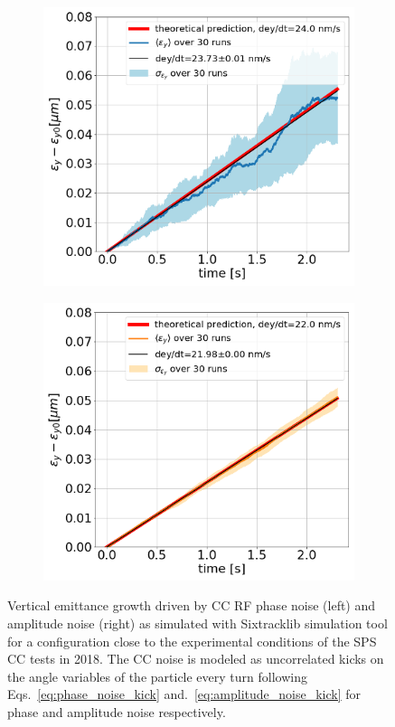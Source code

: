 \begin{figure}[htp]
    \centering
    \begin{subfigure}{.45\textwidth}
        \centering
        \includegraphics[width=.95\linewidth]{images/Ch6/sixtracklib_study_1_CC_PN_normalised _kicks_in_momentum.png}  
    \end{subfigure}
    \begin{subfigure}{.45\textwidth}
        \centering
        \includegraphics[width=.95\linewidth]{images/Ch6/sixtracklib_study_1_AN_normalised_kicks_momentum.png}
    \end{subfigure}
    \caption{Vertical emittance growth driven by CC RF phase noise (left) and amplitude noise (right) as simulated with Sixtracklib simulation tool for a configuration close to the experimental conditions of the SPS CC tests in 2018. The CC noise is modeled as uncorrelated kicks on the angle variables of the particle every turn following Eqs.~\eqref{eq:phase_noise_kick} and.~\eqref{eq:amplitude_noise_kick} for phase and amplitude noise respectively.}
    \label{fig:study_1_sixtracklib_normalised_momentum_kicks}
\end{figure}

